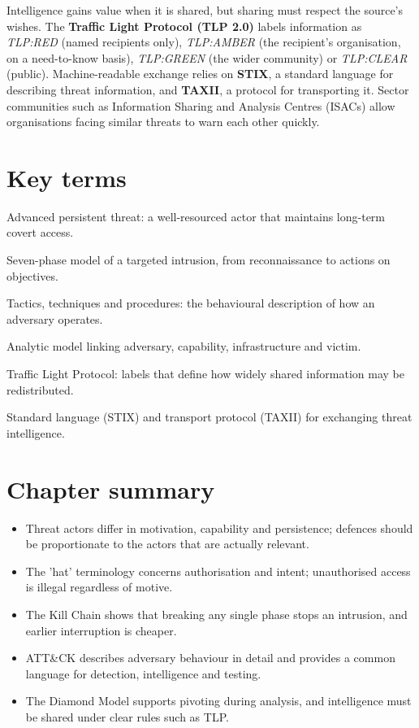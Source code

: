 \documentclass[11pt,openany]{book}
\begin{document}
Intelligence gains value when it is shared, but sharing must respect the source's wishes. The \textbf{Traffic Light Protocol (TLP 2.0)} labels information as \emph{TLP:RED} (named recipients only), \emph{TLP:AMBER} (the recipient's organisation, on a need-to-know basis), \emph{TLP:GREEN} (the wider community) or \emph{TLP:CLEAR} (public). Machine-readable exchange relies on \textbf{STIX}, a standard language for describing threat information, and \textbf{TAXII}, a protocol for transporting it. Sector communities such as Information Sharing and Analysis Centres (ISACs) allow organisations facing similar threats to warn each other quickly.

\section*{Key terms}
\begin{description}[style=nextline,leftmargin=1.2em]
  \item[APT] Advanced persistent threat: a well-resourced actor that maintains long-term covert access.
  \item[Kill Chain] Seven-phase model of a targeted intrusion, from reconnaissance to actions on objectives.
  \item[TTPs] Tactics, techniques and procedures: the behavioural description of how an adversary operates.
  \item[Diamond Model] Analytic model linking adversary, capability, infrastructure and victim.
  \item[TLP] Traffic Light Protocol: labels that define how widely shared information may be redistributed.
  \item[STIX / TAXII] Standard language (STIX) and transport protocol (TAXII) for exchanging threat intelligence.
\end{description}

\section*{Chapter summary}
\begin{itemize}
  \item Threat actors differ in motivation, capability and persistence; defences should be proportionate to the actors that are actually relevant.
  \item The 'hat' terminology concerns authorisation and intent; unauthorised access is illegal regardless of motive.
  \item The Kill Chain shows that breaking any single phase stops an intrusion, and earlier interruption is cheaper.
  \item ATT\&CK describes adversary behaviour in detail and provides a common language for detection, intelligence and testing.
  \item The Diamond Model supports pivoting during analysis, and intelligence must be shared under clear rules such as TLP.
\end{itemize}
\end{document}

